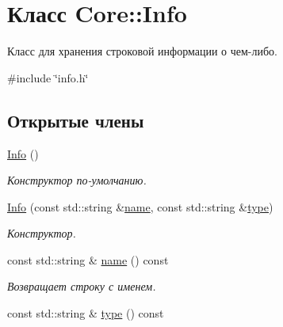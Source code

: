 \hypertarget{class_core_1_1_info}{}\section{Класс Core\+:\+:Info}
\label{class_core_1_1_info}


Класс для хранения строковой информации о чем-\/либо.  




{\ttfamily \#include \char`\"{}info.\+h\char`\"{}}

\subsection*{Открытые члены}
\begin{DoxyCompactItemize}
\item 
\hypertarget{class_core_1_1_info_aa78825dbbf00d030940c6db4e3784da5}{}\label{class_core_1_1_info_aa78825dbbf00d030940c6db4e3784da5} 
\hyperlink{class_core_1_1_info_aa78825dbbf00d030940c6db4e3784da5}{Info} ()
\begin{DoxyCompactList}\small\item\em Конструктор по-\/умолчанию. \end{DoxyCompactList}\item 
\hypertarget{class_core_1_1_info_a3598725146f48899643598bba51af4bc}{}\label{class_core_1_1_info_a3598725146f48899643598bba51af4bc} 
\hyperlink{class_core_1_1_info_a3598725146f48899643598bba51af4bc}{Info} (const std\+::string \&\hyperlink{class_core_1_1_info_a435d4329f0f780950d2c3c73507001df}{name}, const std\+::string \&\hyperlink{class_core_1_1_info_afdee8b88ea976de87576b3314b24aec0}{type})
\begin{DoxyCompactList}\small\item\em Конструктор. \end{DoxyCompactList}\item 
\hypertarget{class_core_1_1_info_a435d4329f0f780950d2c3c73507001df}{}\label{class_core_1_1_info_a435d4329f0f780950d2c3c73507001df} 
const std\+::string \& \hyperlink{class_core_1_1_info_a435d4329f0f780950d2c3c73507001df}{name} () const
\begin{DoxyCompactList}\small\item\em Возвращает строку с именем. \end{DoxyCompactList}\item 
\hypertarget{class_core_1_1_info_afdee8b88ea976de87576b3314b24aec0}{}\label{class_core_1_1_info_afdee8b88ea976de87576b3314b24aec0} 
const std\+::string \& \hyperlink{class_core_1_1_info_afdee8b88ea976de87576b3314b24aec0}{type} () const

\end{DoxyCompactItemize}
